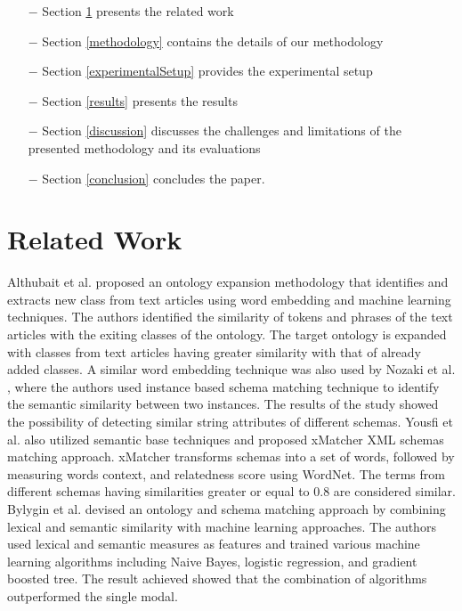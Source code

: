 \documentclass{ieeeaccess}
\begin{document}
\begin{itemize}
	\item[$-$] Section \ref{relatedwork} presents the related work
	\item[$-$] Section \ref{methodology} contains the details of our methodology
	\item[$-$] Section \ref{experimentalSetup} provides the experimental setup
	\item[$-$] Section \ref{results} presents the results
	\item[$-$] Section \ref{discussion} discusses the challenges and limitations of the presented methodology and its evaluations
	\item[$-$] Section \ref{conclusion} concludes the paper.
\end{itemize}



\section{Related Work}
\label{relatedwork}
Althubait et al. \cite{althubaiti2020combining} proposed an ontology expansion methodology that identifies and extracts new class from text articles using word embedding and machine learning techniques. The authors identified the similarity of tokens and phrases of the text articles with the exiting classes of the ontology. The target ontology is expanded with classes from text articles having greater similarity with that of already added classes. A similar word embedding technique was also used by Nozaki et al. \cite{nozaki2019semantic}, where the authors used instance based schema matching technique to identify the semantic similarity between two instances. The results of the study showed the possibility of detecting similar string attributes of different schemas. Yousfi et al. \cite{yousfi2020xmatcher} also utilized semantic base techniques and proposed xMatcher XML schemas matching approach. xMatcher transforms schemas into a set of words, followed by measuring words context, and relatedness score using WordNet. The terms from different schemas having similarities greater or equal to 0.8 are considered similar. 
Bylygin et al. \cite{bulygin2018combining} devised an ontology and schema matching approach by combining lexical and semantic similarity with machine learning approaches.  The authors used lexical and semantic measures as features and trained various machine learning algorithms including Naive Bayes, logistic regression, and gradient boosted tree. The result achieved showed that the combination of algorithms outperformed the single modal.
\end{document}
